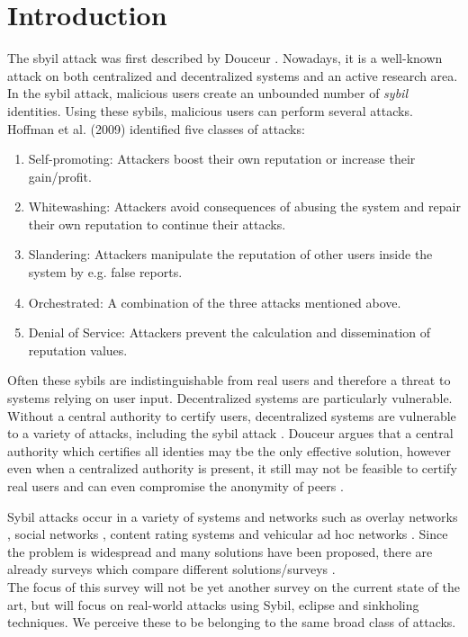 \section{Introduction}
	\label{sct:introduction}
	The sbyil attack was first described by Douceur \cite{douceur2002sybil}. Nowadays, it is a well-known attack on both centralized and decentralized systems and an active research area.
	In the sybil attack, malicious users create an unbounded number of \emph{sybil} identities.
	Using these sybils, malicious users can perform several attacks. 
	Hoffman et al. (2009) \nocite{hoffman2009survey} identified five classes of attacks: 
	\begin{enumerate}
		\item Self-promoting: Attackers boost their own reputation or increase their gain/profit.
		\item Whitewashing: Attackers avoid consequences of abusing the system and repair their own reputation to continue their attacks.
		\item Slandering: Attackers manipulate the reputation of other users inside the system by e.g. false reports.
		\item Orchestrated: A combination of the three attacks mentioned above.
		\item Denial of Service: Attackers prevent the calculation and dissemination of reputation values. 
	\end{enumerate}
	Often these sybils are indistinguishable from real users and therefore a threat to systems relying on user input.
	Decentralized systems are particularly vulnerable.
	Without a central authority to certify users, decentralized systems are vulnerable to a variety of attacks, including the sybil attack \cite{jetter2010quantitative}.
	Douceur argues that a central authority which certifies all identies may tbe the only effective solution, however even when a centralized authority is present, it still may not be feasible to certify real users and can even compromise the anonymity of peers \cite{margolin2005quantifying, dewan2005securing}.
	
	Sybil attacks occur in a variety of systems and networks such as overlay networks \cite{singh2004defending}, social networks \cite{cao2014understanding, chiluka2012leveraging, mohaisen2011keep}, content rating systems \cite{kakhki11mitigating, tran2009sybil} and vehicular ad hoc networks \cite{park2009defense}.
	Since the problem is widespread and many solutions have been proposed, there are already surveys which compare different solutions/surveys \cite{koll2014state, mohaisen2013sybil, viswanath2011analysis}.\\
	The focus of this survey will not be yet another survey on the current state of the art, but will focus on real-world attacks using Sybil, eclipse and sinkholing techniques. 
	We perceive these to be belonging to the same broad class of attacks. 
	
